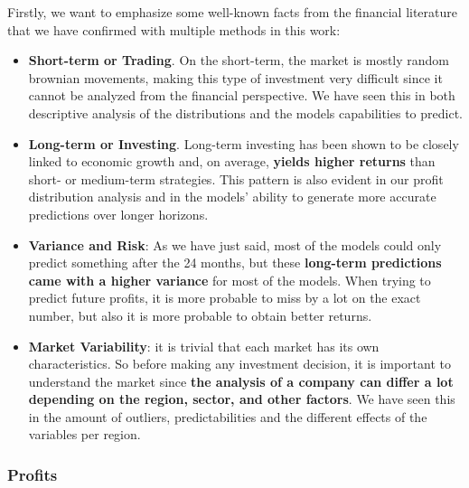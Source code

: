 \documentclass[11pt,english,a4paper,hidelinks]{book}
\begin{document}
\noindent Firstly, we want to emphasize some well-known facts from the financial literature that we have confirmed with multiple methods in this work:
\begin{itemize}
    \item \textbf{Short-term or Trading}. On the short-term, the market is mostly random brownian movements, making this type of investment very difficult since it cannot be analyzed from the financial perspective. We have seen this in both descriptive analysis of the distributions and the models capabilities to predict.
    \item \textbf{Long-term or Investing}. Long-term investing has been shown to be closely linked to economic growth and, on average, \textbf{yields higher returns} than short- or medium-term strategies. This pattern is also evident in our profit distribution analysis and in the models’ ability to generate more accurate predictions over longer horizons.
    \item \textbf{Variance and Risk}: As we have just said, most of the models could only predict something after the 24 months, but these \textbf{long-term predictions came with a higher variance} for most of the models. When trying to predict future profits, it is more probable to miss by a lot on the exact number, but also it is more probable to obtain better returns.
    \item \textbf{Market Variability}: it is trivial that each market has its own characteristics. So before making any investment decision, it is important to understand the market since \textbf{the analysis of a company can differ a lot depending on the region, sector, and other factors}. We have seen this in the amount of outliers, predictabilities and the different effects of the variables per region.
\end{itemize}

\subsubsection{Profits}
\end{document}
